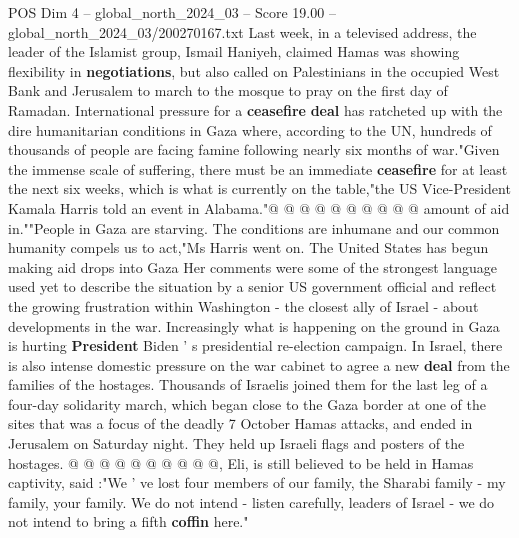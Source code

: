 \begin{textsample}{POS Dim 4 – global\_north\_2024\_03 – Score 19.00 – global\_north\_2024\_03/200270167.txt}
Last week, in a televised address, the leader of the Islamist group, Ismail Haniyeh, claimed Hamas was showing flexibility in \textbf{negotiations}, but also called on Palestinians in the occupied West Bank and Jerusalem to march to the mosque to pray on the first day of Ramadan.
International pressure for a \textbf{ceasefire} \textbf{deal} has ratcheted up with the dire humanitarian conditions in Gaza where, according to the UN, hundreds of thousands of people are facing famine following nearly six months of war."Given the immense scale of suffering, there must be an immediate \textbf{ceasefire} for at least the next six weeks, which is what is currently on the table,"the US Vice-President Kamala Harris told an event in Alabama."@ @ @ @ @ @ @ @ @ @ amount of aid in.""People in Gaza are starving.
The conditions are inhumane and our common humanity compels us to act,"Ms Harris went on.
The United States has begun making aid drops into Gaza Her comments were some of the strongest language used yet to describe the situation by a senior US government official and reflect the growing frustration within Washington - the closest ally of Israel - about developments in the war.
Increasingly what is happening on the ground in Gaza is hurting \textbf{President} Biden ' s presidential re-election campaign.
In Israel, there is also intense domestic pressure on the war cabinet to agree a new \textbf{deal} from the families of the hostages.
Thousands of Israelis joined them for the last leg of a four-day solidarity march, which began close to the Gaza border at one of the sites that was a focus of the deadly 7 October Hamas attacks, and ended in Jerusalem on Saturday night.
They held up Israeli flags and posters of the hostages. @ @ @ @ @ @ @ @ @ @, Eli, is still believed to be held in Hamas captivity, said :"We ' ve lost four members of our family, the Sharabi family - my family, your family.
We do not intend - listen carefully, leaders of Israel - we do not intend to bring a fifth \textbf{coffin} here."

\end{textsample}
